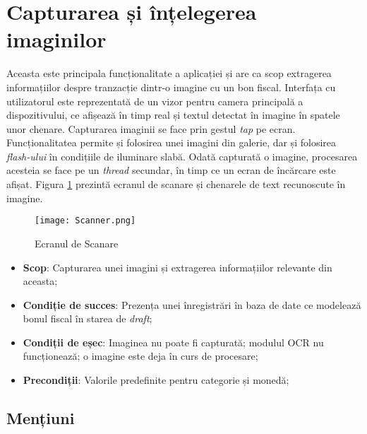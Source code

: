 \section{Capturarea și înțelegerea imaginilor}\label{understanding_spec}



Aceasta este principala funcționalitate a aplicației și are ca scop extragerea informațiilor despre tranzacție dintr-o imagine cu un bon fiscal. Interfața cu utilizatorul este reprezentată de un vizor pentru camera principală a dispozitivului, ce afișează în timp real și textul detectat în imagine în spatele unor chenare.  Capturarea imaginii se face prin gestul \emph{tap} pe ecran. Funcționalitatea permite și folosirea unei imagini din galerie, dar și folosirea \emph{flash-ului} în condițiile de iluminare slabă. Odată capturată o imagine, procesarea acesteia se face pe un \emph{thread} secundar, în timp ce un ecran de încărcare este afișat. Figura \ref{fig:scanner} prezintă ecranul de scanare și chenarele de text recunoscute în imagine.

\begin{figure}[ht]
  \centering
  \texttt{[image: Scanner.png]}
  \caption{Ecranul de Scanare}
  \label{fig:scanner}
\end{figure}

\begin{itemize}
\item
  \textbf{Scop}: Capturarea unei imagini și extragerea informațiilor relevante din aceasta;
\item
  \textbf{Condiție de succes}: Prezența unei înregistrări în baza de date ce modelează bonul fiscal în starea de \emph{draft};
\item
  \textbf{Condiții de eșec}: Imaginea nu poate fi capturată; modulul OCR nu funcționează; o imagine este deja în curs de procesare;
\item
  \textbf{Precondiții}: Valorile predefinite pentru categorie și monedă;
\end{itemize}

\subsection*{Mențiuni}

